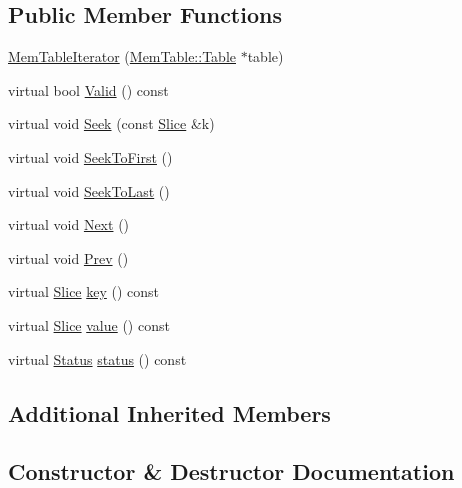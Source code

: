 \subsection*{Public Member Functions}
\begin{DoxyCompactItemize}
\item 
\mbox{\hyperlink{classleveldb_1_1_mem_table_iterator_a3cf243a6e8166d55ce87081f69a5ecd7}{Mem\+Table\+Iterator}} (\mbox{\hyperlink{classleveldb_1_1_skip_list}{Mem\+Table\+::\+Table}} $\ast$table)
\item 
virtual bool \mbox{\hyperlink{classleveldb_1_1_mem_table_iterator_ab991decbbda3c3c76dbc1e3cce446b90}{Valid}} () const
\item 
virtual void \mbox{\hyperlink{classleveldb_1_1_mem_table_iterator_a140f9575286994337de9b49ea7fe62cb}{Seek}} (const \mbox{\hyperlink{classleveldb_1_1_slice}{Slice}} \&k)
\item 
virtual void \mbox{\hyperlink{classleveldb_1_1_mem_table_iterator_a72eaf5c1bcb6d513f71d4edcb8db3f98}{Seek\+To\+First}} ()
\item 
virtual void \mbox{\hyperlink{classleveldb_1_1_mem_table_iterator_aaed044dc887a51c924086f2a2844a5f0}{Seek\+To\+Last}} ()
\item 
virtual void \mbox{\hyperlink{classleveldb_1_1_mem_table_iterator_a8ce5457cf61b989ce1ceec80084f891c}{Next}} ()
\item 
virtual void \mbox{\hyperlink{classleveldb_1_1_mem_table_iterator_a61f8a385b268158a1e7bd0cba29a83c1}{Prev}} ()
\item 
virtual \mbox{\hyperlink{classleveldb_1_1_slice}{Slice}} \mbox{\hyperlink{classleveldb_1_1_mem_table_iterator_a6044613338dfb547fc5148e4b6461d15}{key}} () const
\item 
virtual \mbox{\hyperlink{classleveldb_1_1_slice}{Slice}} \mbox{\hyperlink{classleveldb_1_1_mem_table_iterator_a6c2907c8c87d2b2933adcd5f0e01f781}{value}} () const
\item 
virtual \mbox{\hyperlink{classleveldb_1_1_status}{Status}} \mbox{\hyperlink{classleveldb_1_1_mem_table_iterator_af9bc5f041cd319cfb44408d6bf5aa4a2}{status}} () const
\end{DoxyCompactItemize}
\subsection*{Additional Inherited Members}


\subsection{Constructor \& Destructor Documentation}
\mbox{\label{classleveldb_1_1_mem_table_iterator_a3cf243a6e8166d55ce87081f69a5ecd7}} 
